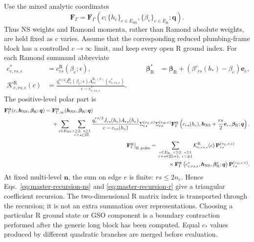 \documentclass[11pt]{article}
\newcommand{\NS}{\mathrm{NS}}
\newcommand{\R}{\mathrm{R}}
\newcommand{\ve}{\bm e}
\begin{document}
Use the mixed analytic coordinates
\begin{equation}
 \mathbf F_\Gamma
 =\mathbf F_\Gamma
 \left(c;\{h_e\}_{e\in E_{\NS}},
          \{\beta_e\}_{e\in E_{\R}};\boldsymbol q\right).
\end{equation}
Thus NS weights and Ramond momenta, rather than Ramond absolute weights, are
held fixed as \(c\) varies.  Assume that the corresponding reduced
plumbing-frame block has a controlled \(c\to\infty\) limit, and keep every
open R ground index.  For each Ramond summand abbreviate
\begin{equation}
\begin{aligned}
 c^*_{e,rs,\epsilon}
 &=c^{\R}_{rs}(\beta_e;\epsilon),
 &\qquad
 \boldsymbol\beta_{\R}^{*}
 &=
 \boldsymbol\beta_{\R}
 +(\beta'_{rs}(b_*)-\beta_e)\ve_e ,
 \\
 \mathcal K^{\R}_{e,rs,\epsilon}(c)
 &=
 \frac{
 q_e^{rs/2}J^{\R}_{rs}(\beta_e;\epsilon)
 A^{\R,(h)}_{rs}(c^*_{e,rs,\epsilon})}
 {c-c^*_{e,rs,\epsilon}} .
\end{aligned}
\end{equation}
The positive-level polar part is
{\small
\begin{align}
 \begin{aligned}
 \mathbf F_{\Gamma}^{\boldsymbol\alpha}
 (c,\boldsymbol h_{\NS},\boldsymbol\beta_{\R};\boldsymbol q)
={}&\mathbf F_{\Gamma,\infty}^{\boldsymbol\alpha}
 (\boldsymbol h_{\NS},\boldsymbol\beta_{\R};\boldsymbol q)
\\
&+\sum_{e\in E_{\NS}}
  \sum_{\substack{r\ge2,\ s\ge1\\r+s\in2\mathbb Z}}
 \frac{q_e^{rs/2}J_{rs}(h_e)A_{rs}(h_e)}
      {c-c_{rs}(h_e)}
 \Sigma_{rs}^{(v_L,e)}\Sigma_{rs}^{(v_R,e)}
 \mathbf F_{\Gamma}^{\boldsymbol\alpha}
 \left(c_{rs}(h_e),
 \boldsymbol h_{\NS}+\frac{rs}{2}\ve_e,
 \boldsymbol\beta_{\R};
 \boldsymbol q\right).
 \end{aligned}
 \label{eq:master-recursion-ns}\\[0.4em]
 \begin{aligned}
 \mathbf F_{\Gamma}^{\boldsymbol\alpha}
 \big|_{\text{R poles}}
={}&
 \sum_{\substack{
 e\in E_{\R},\ r\ge2,\ s\ge1\\
 r+s\in2\mathbb Z+1,\ \epsilon=\pm1}}
 \mathcal K^{\R}_{e,rs,\epsilon}(c)\,
 \mathbf P_{rs}^{(v_L,e;\epsilon)}
 \\
 &\hspace{2.0em}\times
 \mathbf F_{\Gamma}^{\boldsymbol\alpha}
 \left(c^*_{e,rs,\epsilon},
 \boldsymbol h_{\NS},\boldsymbol\beta_{\R}^{*};
 \boldsymbol q\right)
 \mathbf P_{rs}^{(v_R,e;\epsilon)} .
 \end{aligned}
 \label{eq:master-recursion-r}
\end{align}
}
At fixed multi-level $\boldsymbol n$, the sum on edge $e$ is finite:
$rs\le2n_e$.  Hence Eqs.~\eqref{eq:master-recursion-ns} and
\eqref{eq:master-recursion-r} give a triangular coefficient recursion.
The two-dimensional R matrix index is transported through the recursion; it
is not an extra summation over representations.  Choosing a particular R
ground state or GSO component is a boundary contraction performed after the
generic long block has been computed.  Equal \(c_*\) values produced by
different quadratic branches are merged before evaluation.
\end{document}

